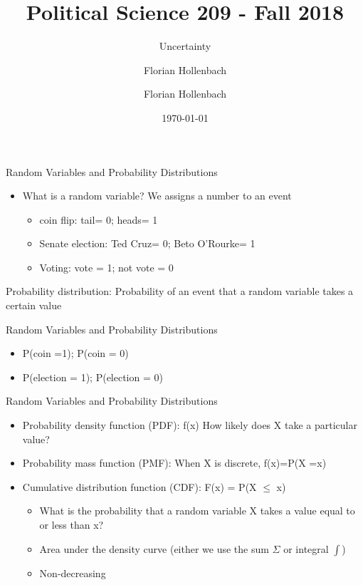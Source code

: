 \documentclass[presentation]{beamer}
\author{Florian Hollenbach}
\author{Florian Hollenbach}
\date{\today}
\title{Political Science 209 - Fall 2018}
\subtitle{Uncertainty}
\begin{document}
\maketitle


\begin{frame}[label={sec:org5f660ea}]{Random Variables and Probability Distributions}
\begin{itemize}
\item What is a random variable? We assigns a number to an event
\begin{itemize}
\item coin flip: tail= 0; heads= 1
\item Senate election: Ted Cruz= 0; Beto O'Rourke= 1
\item Voting: vote = 1; not vote = 0
\end{itemize}
\end{itemize}



\pause

Probability distribution: Probability of an event that a random variable takes a certain value
\end{frame}


\begin{frame}[label={sec:orgedf0a05}]{Random Variables and Probability Distributions}
\begin{itemize}
\item P(coin =1); P(coin = 0)
\item P(election = 1); P(election = 0)
\end{itemize}
\end{frame}


\begin{frame}[label={sec:org7a40ade}]{Random Variables and Probability Distributions}
\begin{itemize}
\item \alert{Probability density function (PDF)}: f(x) How likely does X take a particular value?
\item \alert{Probability mass function (PMF)}: When X is discrete, f(x)=P(X =x)
\end{itemize}

\pause

\begin{itemize}
\item \alert{Cumulative distribution function (CDF)}: F(x) = P(X \(\leq\) x)
\begin{itemize}
\item What is the probability that a random variable X takes a value equal to or less than x?
\item Area under the density curve (either we use the sum \(\Sigma\) or integral \(\int\))
\item Non-decreasing
\end{itemize}
\end{itemize}
\end{frame}
\end{document}
